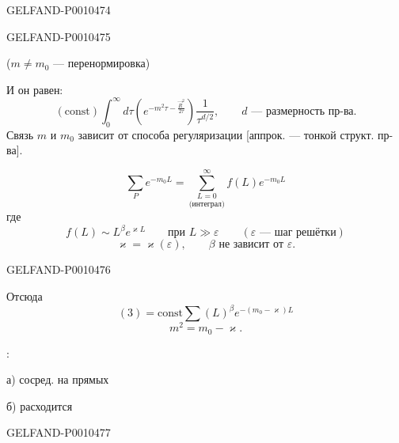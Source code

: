 \begin{GelfandAdjacentEvidence}{GELFAND-P001047}{4}

\end{GelfandAdjacentEvidence}
\begin{GelfandAdjacentEvidence}{GELFAND-P001047}{5}


($m\ne m_0$ — перенормировка)

И он равен:
\begin{equation*}
(\mathrm{const})\int_0^\infty d\tau
\left(e^{-m^2\tau-\frac{\vec R^{2}}{2\tau}}\right)\frac1{\tau^{d/2}},
\qquad d\text{ — размерность пр-ва}.
\tag{2'}
\end{equation*}
Связь $m$ и $m_0$ зависит от способа регуляризации [аппрок. — тонкой структ. пр-ва].

\begin{equation*}
\sum_P e^{-m_0L}=
\underset{\text{(интеграл)}}{\sum_{L=0}^{\infty}} f(L)e^{-m_0L}
\tag{3}
\end{equation*}
где
\[
f(L)\sim L^\beta e^{\varkappa L}
\qquad\text{при }L\gg\varepsilon
\qquad(\varepsilon\text{ — шаг решётки})
\]
\[
\varkappa=\varkappa(\varepsilon),\qquad\beta\text{ не зависит от }\varepsilon.
\]
\end{GelfandAdjacentEvidence}
\begin{GelfandAdjacentEvidence}{GELFAND-P001047}{6}


Отсюда
\begin{equation*}
(3)=\mathrm{const}\sum(L)^\beta e^{-(m_0-\varkappa)L}
\tag{4}
\end{equation*}
\[
m^2=m_0-\varkappa.
\]

:

а) сосред. на прямых

б) расходится

\end{GelfandAdjacentEvidence}
\begin{GelfandAdjacentEvidence}{GELFAND-P001047}{7}

\end{GelfandAdjacentEvidence}



